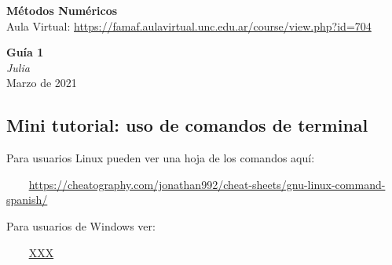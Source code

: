 \documentclass[a4paper]{article}
\begin{document}
\renewcommand{\labelenumi}{\bf \alph{enumi})}
\renewcommand{\labelenumii}{\alph{enumi}$_\arabic{enumii}$)}
\begin{center}
{\large {\bf M\'etodos Num\'ericos}}\\
{\small Aula Virtual: 
\href{https://famaf.aulavirtual.unc.edu.ar/course/view.php?id=704}
{https://famaf.aulavirtual.unc.edu.ar/course/view.php?id=704}
	} \\

\vspace*{1.5cm} 
\rule{0em}{2.em}
{\bf Gu\'{i}a 1} \\ 
{\em Julia} \\
Marzo de 2021
\end{center}
\vspace*{.5cm} 






\subsection*{Mini tutorial: uso de comandos de terminal}

Para usuarios Linux pueden ver una hoja de los comandos aqu\'i: 

\verb+    +\href{https://cheatography.com/jonathan992/cheat-sheets/gnu-linux-command-spanish/}
{https://cheatography.com/jonathan992/cheat-sheets/gnu-linux-command-spanish/}
    
Para usuarios de Windows ver:

\verb+    +\href{XXX}
{XXX}
\end{document}
